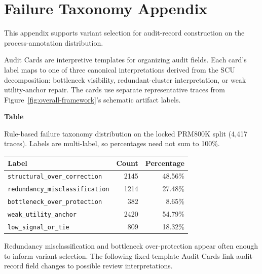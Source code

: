 \documentclass[pdflatex,sn-mathphys-num]{sn-jnl}
\begin{document}
\appendix

\section{Failure Taxonomy Appendix}
\label{app:failure-taxonomy}

This appendix supports variant selection for audit-record construction on the process-annotation distribution.

Audit Cards are interpretive templates for organizing audit fields. Each card's label maps to one of three canonical interpretations derived from the SCU decomposition: bottleneck visibility, redundant-cluster interpretation, or weak utility-anchor repair. The cards use separate representative traces from Figure~\ref{fig:overall-framework}'s schematic artifact labels.

\par\medskip
{}\label{tab:failure-taxonomy}
\noindent\textbf{Table~\thetable}\par
\noindent Rule-based failure taxonomy distribution on the locked PRM800K split (4,417 traces). Labels are multi-label, so percentages need not sum to 100\%.
\begin{center}
\small
\renewcommand{\arraystretch}{1.08}
\begin{tabular}{lrr}
\toprule
\textbf{Label} & \textbf{Count} & \textbf{Percentage} \\
\midrule
\texttt{structural\_over\_correction} & 2145 & 48.56\% \\
\texttt{redundancy\_misclassification} & 1214 & 27.48\% \\
\texttt{bottleneck\_over\_protection} & 382 & 8.65\% \\
\texttt{weak\_utility\_anchor} & 2420 & 54.79\% \\
\texttt{low\_signal\_or\_tie} & 809 & 18.32\% \\
\bottomrule
\end{tabular}
\end{center}
\medskip

Redundancy misclassification and bottleneck over-protection appear often enough to inform variant selection. The following fixed-template Audit Cards link audit-record field changes to possible review interpretations.
\end{document}
